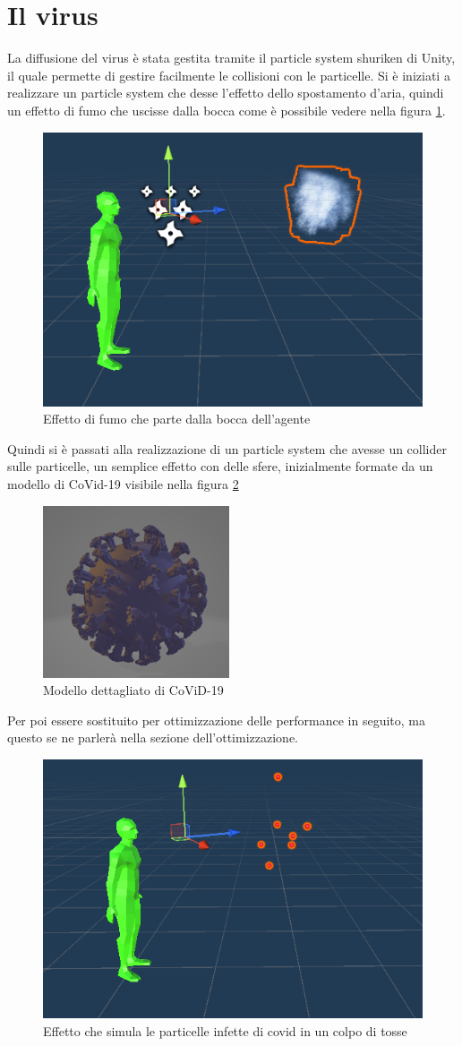 \documentclass[12pt, openany]{book}
\begin{document}
 	\section{Il virus}
 	La diffusione del virus è stata gestita tramite il particle system shuriken di Unity, il quale permette di gestire facilmente le collisioni con le particelle. Si è iniziati a realizzare un particle system che desse l'effetto dello spostamento d'aria, quindi un effetto di fumo che uscisse dalla bocca come è possibile vedere nella figura \ref{fig:SmokeEffect}.
 	\begin{figure}[H]
 		\centering
 		\includegraphics[width=0.5\linewidth]{"Immagini/SmokeEffect.png"}
 		\caption{Effetto di fumo che parte dalla bocca dell'agente}
 		\label{fig:SmokeEffect}
 	\end{figure}
 	Quindi si è passati alla realizzazione di un particle system che avesse un collider sulle particelle, un semplice effetto con delle sfere, inizialmente formate da un modello di CoVid-19 visibile nella figura \ref{fig:Covid}
 	\begin{figure}[H]
 		\centering
 		\includegraphics[width=0.5\linewidth]{"Immagini/Covid.png"}
 		\caption{Modello dettagliato di CoViD-19}
 		\label{fig:Covid}
 	\end{figure}
 	Per poi essere sostituito per ottimizzazione delle performance in seguito, ma questo se ne parlerà nella sezione dell'ottimizzazione.
 	\begin{figure}[H]
 		\centering
 		\includegraphics[width=0.5\linewidth]{"Immagini/CovidEffect.png"}
 		\caption{Effetto che simula le particelle infette di covid in un colpo di tosse}
 		\label{fig:CovidEffect}
 	\end{figure}
\end{document}
